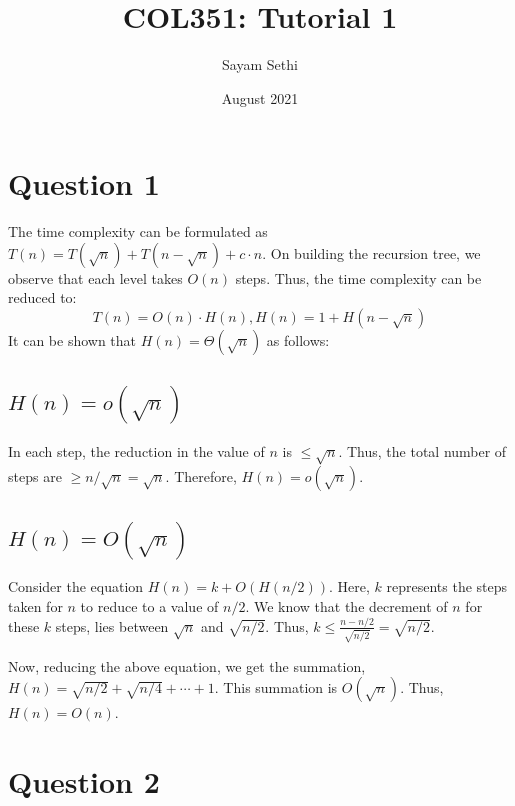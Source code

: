\documentclass[11pt]{article}
\title{COL351: Tutorial 1}
\author{Sayam Sethi}
\date{August 2021}
\begin{document}
\maketitle

\tableofcontents

\section{Question 1}
The time complexity can be formulated as $T(n) = T(\sqrt{n}) + T(n - \sqrt{n}) + c \cdot n$. On building the recursion tree, we observe that each level takes $O(n)$ steps. Thus, the time complexity can be reduced to:
\begin{equation}
    T(n) = O(n) \cdot H(n), H(n) = 1 + H(n - \sqrt{n})
\end{equation}
It can be shown that $H(n) = \Theta(\sqrt{n})$ as follows:

\subsection{$H(n) = o(\sqrt{n})$}
In each step, the reduction in the value of $n$ is $\leq \sqrt{n}$. Thus, the total number of steps are $\geq n / \sqrt{n} = \sqrt{n}$. Therefore, $H(n) = o(\sqrt{n})$.

\subsection{$H(n) = O(\sqrt{n})$}
Consider the equation $H(n) = k + O(H(n/2))$. Here, $k$ represents the steps taken for $n$ to reduce to a value of $n/2$. We know that the decrement of $n$ for these $k$ steps, lies between $\sqrt{n}$ and $\sqrt{n/2}$. Thus, $k \leq \frac{n - n/2}{\sqrt{n/2}} = \sqrt{n/2}$.\par
Now, reducing the above equation, we get the summation, $H(n) = \sqrt{n/2} + \sqrt{n/4} + \cdots + 1$. This summation is $O(\sqrt{n})$. Thus, $H(n) = O(n)$.

\section{Question 2}
\end{document}
